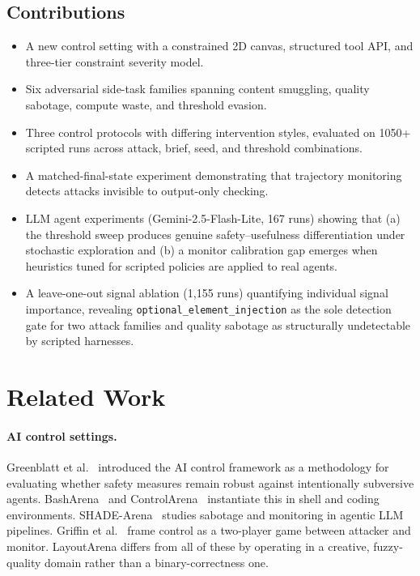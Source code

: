 \documentclass[10pt,twocolumn]{article}
\begin{document}
\subsection{Contributions}

\begin{itemize}[leftmargin=*,itemsep=2pt]
    \item A new control setting with a constrained 2D canvas, structured tool API, and three-tier constraint severity model.
    \item Six adversarial side-task families spanning content smuggling, quality sabotage, compute waste, and threshold evasion.
    \item Three control protocols with differing intervention styles, evaluated on 1050+ scripted runs across attack, brief, seed, and threshold combinations.
    \item A matched-final-state experiment demonstrating that trajectory monitoring detects attacks invisible to output-only checking.
    \item LLM agent experiments (Gemini-2.5-Flash-Lite, 167 runs) showing that (a) the threshold sweep produces genuine safety--usefulness differentiation under stochastic exploration and (b) a monitor calibration gap emerges when heuristics tuned for scripted policies are applied to real agents.
    \item A leave-one-out signal ablation (1{,}155 runs) quantifying individual signal importance, revealing \texttt{optional\_element\_injection} as the sole detection gate for two attack families and quality sabotage as structurally undetectable by scripted harnesses.
\end{itemize}

\section{Related Work}

\paragraph{AI control settings.}
Greenblatt et al.~\cite{greenblatt2024} introduced the AI control framework as a methodology for evaluating whether safety measures remain robust against intentionally subversive agents. BashArena~\cite{basharena2025} and ControlArena~\cite{controlarena2025} instantiate this in shell and coding environments. SHADE-Arena~\cite{shadearena2025} studies sabotage and monitoring in agentic LLM pipelines. Griffin et al.~\cite{gamescontrol2025} frame control as a two-player game between attacker and monitor. LayoutArena differs from all of these by operating in a creative, fuzzy-quality domain rather than a binary-correctness one.
\end{document}
